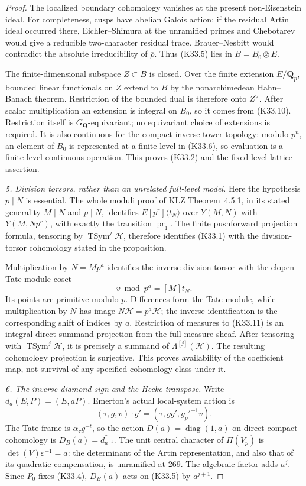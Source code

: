 \begin{proof}
The localized boundary cohomology vanishes at the present
non-Eisenstein ideal.  For completeness, cusps have abelian
Galois action; if the residual Artin ideal occurred there,
Eichler--Shimura at the unramified primes and Chebotarev
would give a reducible two-character residual trace.
Brauer--Nesbitt would contradict the absolute irreducibility
of \(\overline\rho\).  Thus (K33.5) lies in \(B=B_0\otimes E\).

The finite-dimensional subspace \(Z\subset B\) is closed.
Over the finite extension \(E/\mathbf Q_p\), bounded linear
functionals on \(Z\) extend to \(B\) by the nonarchimedean
Hahn--Banach theorem.  Restriction of the bounded dual is
therefore onto \(Z^\vee\).  After scalar multiplication an
extension is integral on \(B_0\), so it comes from (K33.10).
Restriction itself is \(G_{\mathbf Q}\)-equivariant; no
equivariant choice of extensions is required.  It is also
continuous for the compact inverse-tower topology: modulo
\(p^n\), an element of \(B_0\) is represented at a finite
level in (K33.6), so evaluation is a finite-level continuous
operation.  This proves (K33.2) and the fixed-level lattice
assertion.

\emph{5. Division torsors, rather than an unrelated full-level model.}
Here the hypothesis \(p\mid N\) is essential.  The whole
moduli proof of KLZ Theorem~4.5.1, in its stated generality \(M\mid N\)
and \(p\mid N\), identifies
\(E[p^r]\langle t_N\rangle\) over \(Y(M,N)\) with
\(Y(M,Np^r)\), with exactly
the transition \(\operatorname{pr}_1\).
The finite pushforward projection formula, tensoring by
\(\operatorname{TSym}^j\mathcal H\), therefore identifies
(K33.1) with the division-torsor cohomology stated in the
proposition.

Multiplication by \(N=Mp^a\) identifies the inverse division
torsor with the clopen Tate-module coset
\[
 v\bmod p^a=[M]t_N.
 \tag{K33.11}
\]
Its points are primitive modulo \(p\).  Differences form the
Tate module, while multiplication by \(N\) has image
\(N\mathcal H=p^a\mathcal H\); the inverse identification is
the corresponding shift of indices by \(a\).
Restriction of measures to (K33.11) is an integral direct
summand projection from the full measure sheaf.
After tensoring with \(\operatorname{TSym}^j\mathcal H\),
it is precisely a summand of
\(\Lambda^{[j]}(\mathcal H)\).  The resulting cohomology
projection is surjective.  This proves availability of the
coefficient map, not survival of any specified cohomology
class under it.

\emph{6. The inverse-diamond sign and the Hecke transpose.}
Write \(d_a(E,P)=(E,aP)\).
Emerton's actual local-system action is
\[
 (\tau,g,v)\cdot g'=(\tau,gg',g_p'^{-1}v).
 \tag{K33.12}
\]
The Tate frame is \(\alpha_\tau g^{-t}\), so the action
\(D(a)=\operatorname{diag}(1,a)\) on direct compact cohomology
is \(D_B(a)=d_{a^{-1}}^*\).
The unit central character of \(\Pi(V_p)\) is
\(\det(V)\varepsilon^{-1}=a\): the determinant of the
Artin representation, and also that of its quadratic
compensation, is unramified at \(269\).
The algebraic factor adds \(a^j\).  Since \(P_0\) fixes
(K33.4), \(D_B(a)\) acts on (K33.5) by \(a^{j+1}\).


\end{proof}
